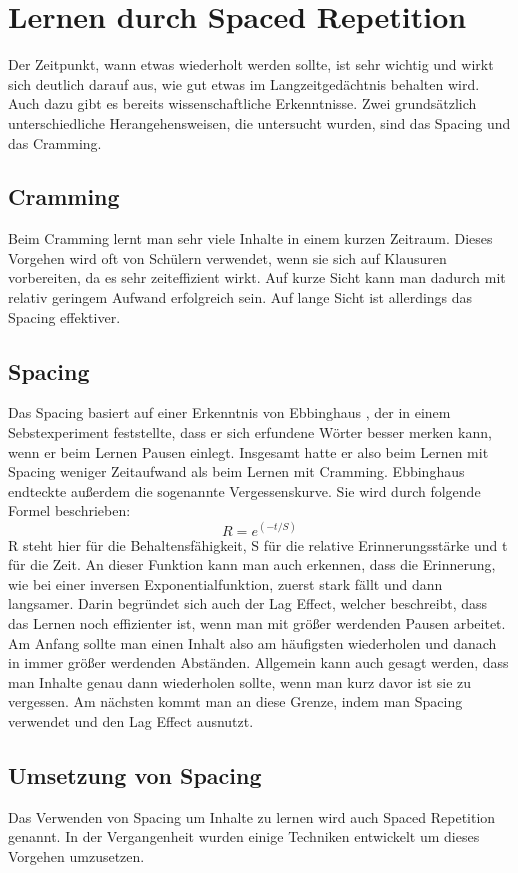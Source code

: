 \section{Lernen durch Spaced Repetition}
Der Zeitpunkt, wann etwas wiederholt werden sollte, ist sehr wichtig und wirkt sich deutlich darauf aus, wie gut etwas im Langzeitgedächtnis behalten wird. Auch dazu gibt es bereits wissenschaftliche Erkenntnisse.
Zwei grundsätzlich unterschiedliche Herangehensweisen, die untersucht wurden, sind das Spacing und das Cramming.

\subsection{Cramming}
Beim Cramming lernt man sehr viele Inhalte in einem kurzen Zeitraum. Dieses Vorgehen wird oft von Schülern verwendet, wenn sie sich auf Klausuren vorbereiten, da es sehr zeiteffizient wirkt. Auf kurze Sicht kann man dadurch mit relativ geringem Aufwand erfolgreich sein. Auf lange Sicht ist allerdings das Spacing effektiver.
\cite{schimanke_spaced_2017}

\subsection{Spacing}
\label{cp:Spacing}
Das Spacing basiert auf einer Erkenntnis von Ebbinghaus \cite{hermann_ebbinghaus_uber_1885}, der in einem Sebstexperiment feststellte, dass er sich erfundene Wörter besser merken kann, wenn er beim Lernen Pausen einlegt. Insgesamt hatte er also beim Lernen mit Spacing weniger Zeitaufwand als beim Lernen mit Cramming. Ebbinghaus endteckte außerdem die sogenannte Vergessenskurve.
Sie wird durch folgende Formel beschrieben:
$$R = e^{(-t/S)}$$
R steht hier für die Behaltensfähigkeit, S für die relative Erinnerungsstärke und t für die Zeit.
An dieser Funktion kann man auch erkennen, dass die Erinnerung, wie bei einer inversen Exponentialfunktion, zuerst stark fällt und dann langsamer. Darin begründet sich auch der Lag Effect, welcher beschreibt, dass das Lernen noch effizienter ist, wenn man mit größer werdenden Pausen arbeitet. Am Anfang sollte man einen Inhalt also am häufigsten wiederholen und danach in immer größer werdenden Abständen. Allgemein kann auch gesagt werden, dass man Inhalte genau dann wiederholen sollte, wenn man kurz davor ist sie zu vergessen. Am nächsten kommt man an diese Grenze, indem man Spacing verwendet und den Lag Effect ausnutzt.
\cite{schimanke_spaced_2017}

\subsection{Umsetzung von Spacing}
Das Verwenden von Spacing um Inhalte zu lernen wird auch Spaced Repetition genannt. In der Vergangenheit wurden einige Techniken entwickelt um dieses Vorgehen umzusetzen.

